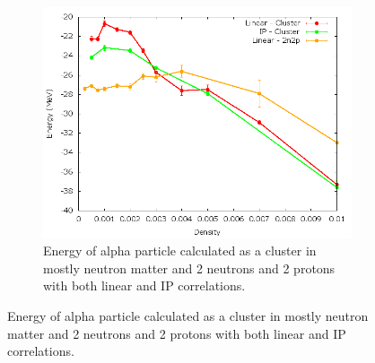 \documentclass[12pt]{article}
\newcommand{\red}[1]{{\color{red}{#1}}}
\begin{document}
\begin{figure}[h!]
\begin{subfigure}{0.49\textwidth}
   \end{subfigure}
   ~
   \begin{subfigure}{0.49\textwidth}
      \includegraphics[width=\textwidth]{../alpha_and_2n2p.png}
      \caption{\red{This will be updated when the IP calculations are done.}Energy of alpha particle calculated as a cluster in mostly neutron matter and 2 neutrons and 2 protons with both linear and IP correlations.}
   \end{subfigure}
\end{figure}


\clearpage


\end{document}
